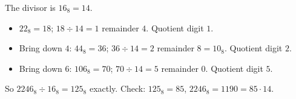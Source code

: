 The divisor is $16_8=14$.
\begin{itemize}
\item $22_8=18$; $18\div14=1$ remainder $4$. Quotient digit $1$.
\item Bring down $4$: $44_8=36$; $36\div14=2$ remainder $8=10_8$. Quotient digit $2$.
\item Bring down $6$: $106_8=70$; $70\div14=5$ remainder $0$. Quotient digit $5$.
\end{itemize}
So $2246_8\div16_8=\boxed{125_8}$ exactly. Check: $125_8=85$, $2246_8=1190=85\cdot14$.
